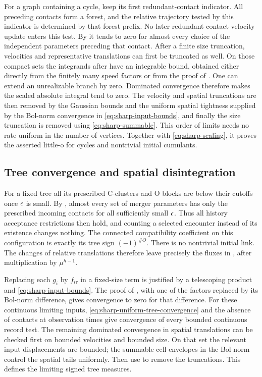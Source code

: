 For a graph containing a cycle, keep its first redundant-contact
indicator.  All preceding contacts form a forest, and the relative
trajectory tested by this indicator is determined by that forest
prefix.  No later redundant-contact velocity update enters this test.
By  it tends to zero for almost
every choice of the independent parameters preceding that contact.
After a finite size truncation, velocities and representative
translations can first be truncated as well.  On those compact
sets the integrands after  have
an integrable bound, obtained either directly from the finitely
many speed factors or from the proof of
.  One can extend an unrealizable
branch by zero.  Dominated convergence therefore makes the
scaled absolute integral tend to zero.  The velocity and spatial
truncations are then removed by the Gaussian bounds and the uniform
spatial tightness supplied by the Bol-norm convergence in
\eqref{eq:sharp-input-bounds}, and
finally the size truncation is removed using
\eqref{eq:sharp-summable}.  This order of limits needs no rate
uniform in the number of vertices.  Together with
\eqref{eq:sharp-scaling}, it proves the asserted little-o for
cycles and nontrivial initial cumulants.

\subsection{Tree convergence and spatial disintegration}

For a fixed tree all its prescribed C-clusters and O blocks are
below their cutoffs once \(\epsilon\) is small.  By
, almost every set of merger parameters
has only the prescribed incoming contacts for all sufficiently
small \(\epsilon\).  Thus all history acceptance restrictions then
hold, and counting a selected encounter instead of its existence
changes nothing.  The connected compatibility coefficient on
this configuration is exactly its tree sign \((-1)^{\#O}\).
There is no nontrivial initial link.  The changes of relative
translations therefore leave precisely the fluxes in
, after multiplication by
\(\mu^{h-1}\).

Replacing each \(g_i\) by \(f_{i\tau}\) in a fixed-size term is
justified by a telescoping product and
\eqref{eq:sharp-input-bounds}.  The proof of
, with one of the factors replaced by
its Bol-norm difference, gives convergence to zero for that
difference.  For these continuous limiting inputs,
\eqref{eq:sharp-uniform-tree-convergence} and the absence of
contacts at observation times give convergence of every bounded
continuous record test.  The remaining dominated convergence in
spatial translations can be checked first on bounded velocities
and bounded size.  On that set the relevant input displacements
are bounded; the summable cell envelopes in the Bol norm control
the spatial tails uniformly.  Then use
 to remove the truncations.  This
defines the limiting signed tree measures.

